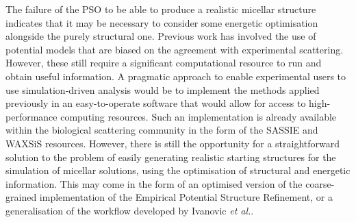 The failure of the PSO to be able to produce a realistic micellar structure indicates that it may be necessary to consider some energetic optimisation alongside the purely structural one.
Previous work has involved the use of potential models that are biased on the agreement with experimental scattering.
However, these still require a significant computational resource to run and obtain useful information.
A pragmatic approach to enable experimental users to use simulation-driven analysis would be to implement the methods applied previously in an easy-to-operate software that would allow for access to high-performance computing resources.
Such an implementation is already available within the biological scattering community in the form of the SASSIE and WAXSiS resources.
However, there is still the opportunity for a straightforward solution to the problem of easily generating realistic starting structures for the simulation of micellar solutions, using the optimisation of structural and energetic information.
This may come in the form of an optimised version of the coarse-grained implementation of the Empirical Potential Structure Refinement, or a generalisation of the workflow developed by Ivanovic \emph{et al.}.

